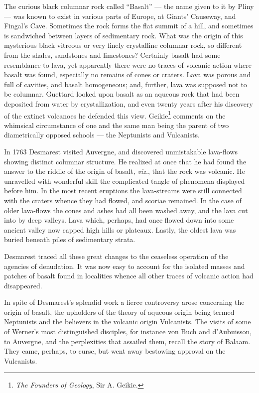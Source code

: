 \documentclass[a4paper, 12pt, oneside]{article}
\begin{document}
The curious black columnar rock called ``Basalt'' --- the name given to it by Pliny --- was known to exist in various parts of Europe, at Giants' Causeway, and Fingal's Cave. Sometimes the rock forms the flat summit of a hill, and sometimes is sandwiched between layers of sedimentary rock. What was the origin of this mysterious black vitreous or very finely crystalline columnar rock, so different from the shales, sandstones and limestones? Certainly basalt had some resemblance to lava, yet apparently there were no traces of volcanic action where basalt was found, especially no remains of cones or craters. Lava was porous and full of cavities, and basalt homogeneous; and, further, lava was supposed not to be columnar. Guettard looked upon basalt as an aqueous rock that had been deposited from water by crystallization, and even twenty years after his discovery of the extinct volcanoes he defended this view. Geikie\footnote{\emph{The Founders of Geology}, Sir A. Geikie.} comments on the whimsical circumstance of one and the same man being the parent of two diametrically opposed schools --- the Neptunists and Vulcanists.

In 1763 Desmarest visited Auvergne, and discovered unmistakable lava-flows showing distinct columnar structure. He realized at once that he had found the answer to the riddle of the origin of basalt, \emph{viz.}, that the rock was volcanic. He unravelled with wonderful skill the complicated tangle of phenomena displayed before him. In the most recent eruptions the lava-streams were still connected with the craters whence they had flowed, and scoriae remained. In the case of older lava-flows the cones and ashes had all been washed away, and the lava cut into by deep valleys. Lava which, perhaps, had once flowed down into some ancient valley now capped high hills or plateaux. Lastly, the oldest lava was buried beneath piles of sedimentary strata.

Desmarest traced all these great changes to the ceaseless operation of the agencies of denudation. It was now easy to account for the isolated masses and patches of basalt found in localities whence all other traces of volcanic action had disappeared.

In spite of Desmarest's splendid work a fierce controversy arose concerning the origin of basalt, the upholders of the theory of aqueous origin being termed Neptunists and the believers in the volcanic origin Vulcanists. The visits of some of Werner's most distinguished disciples, for instance von Buch and d'Aubuisson, to Auvergne, and the perplexities that assailed them, recall the story of Balaam. They came, perhaps, to curse, but went away bestowing approval on the Vulcanists.
\end{document}
